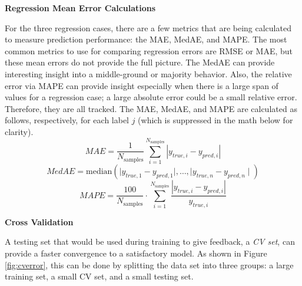 \noindent \textbf{Regression Mean Error Calculations}

For the three regression cases, there are a few metrics that are being
calculated to measure prediction performance: the \gls{MAE}, \gls{MedAE}, and
\gls{MAPE}. The most common metrics to use for comparing regression errors are
\gls{RMSE} or \gls{MAE}, but these mean errors do not provide the full picture.
The \gls{MedAE} can provide interesting insight into a middle-ground or
majority behavior. Also, the relative error via \gls{MAPE} can provide insight
especially when there is a large span of values for a regression case; a large
absolute error could be a small relative error. Therefore, they are all
tracked.  The \gls{MAE}, \gls{MedAE}, and \gls{MAPE} are calculated as follows,
respectively, for each label $j$ (which is suppressed in the math below for
clarity).
\begin{equation}
  \textit{MAE} = \frac{1}{N_{\text{samples}}} \sum_{i=1}^{N_{\text{samples}}} 
                 \left| y_{true, i} - y_{pred, i} \right|
\end{equation}
\begin{equation}
  \textit{MedAE} = \text{median}(\mid y_{true, 1} - y_{pred, 1} \mid, \ldots, 
                                 \mid y_{true, n} - y_{pred, n} \mid)
\end{equation}
\begin{equation}
  \textit{MAPE} =  \frac{100}{N_{\text{samples}}} \cdot 
                   \sum_{i=1}^{N_{\text{samples}}}
                   \frac{\left| y_{true, i} - y_{pred, i} \right|}{y_{true, i}}
\end{equation}

\noindent \textbf{Cross Validation}

A testing set that would be used during training to give feedback, a
\textit{\gls{CV} set}, can provide a faster convergence to a satisfactory
model. As shown in Figure \ref{fig:cverror}, this can be done by splitting the
data set into three groups: a large training set, a small \gls{CV} set, and a
small testing set.  

